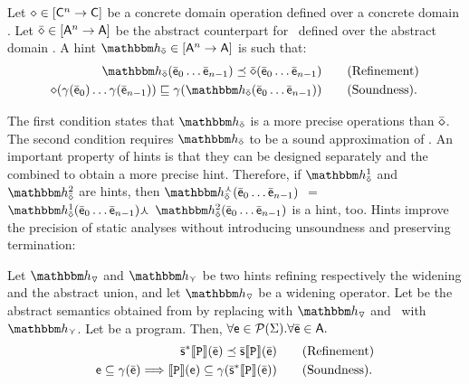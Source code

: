 \documentclass{llncs}
\begin{document}
\begin{definition}
\label{def:hints}
Let $\diamond \in [\mathsf{C}^n \rightarrow\mathsf{C}]$ be a concrete domain operation defined over a concrete domain .
Let $\bar{\mathsf{\mathsf{\diamond}}} \in [{\mathsf{A}}^n \rightarrow{\mathsf{A}}]$ be the abstract counterpart for \op\ defined over the abstract domain  .
A hint $\hint{\ael{\op}}\in \funzione{\adom{A}^n}{\adom{A}}$ is  such that:
\[
\begin{aligned}
\hint{\ael{\op}}(\ael{e}_0 \dots \ael{e}_{n-1}) \cless \ael{\op}(\ael{e}_0 \dots \ael{e}_{n-1}) & \qquad \text{\textrm{(Refinement)}}  \\
\op(\gamma( \ael{e}_0) \dots \gamma(\ael{e}_{n-1})) \less \gamma(\hint{\ael{\op}}(\ael{e}_0 \dots \ael{e}_{n-1})) & \qquad \text(\textrm{Soundness}).
\end{aligned}
\]
\end{definition}
The first condition states that $\hint{\ael{\op}}$ is a more precise operations than $\bar{\mathsf{\mathsf{\diamond}}}$.
The second condition requires $\hint{\ael{\op}}$ to be a sound approximation of \op.
An important property of hints is that they can be designed separately and the combined to obtain a more precise hint.
Therefore, if $\hint{\ael{\op}}^1$ and $\hint{\ael{\op}}^2$ are hints, then $\hint{\ael{\op}}^\cmeet(\ael{e}_0 \dots \ael{e}_{n-1})$ $=$ $\hint{\ael{\op}}^1(\ael{e}_0 \dots \ael{e}_{n-1}) \cmeet $ $\hint{\ael{\op}}^2(\ael{e}_0 \dots \ael{e}_{n-1})$ is a hint, too.
Hints improve the precision of static analyses without introducing unsoundness and preserving termination:

\begin{theorem}
Let $\hint{\widening}$ and $\hint{\cjoin}$ be two hints refining respectively the widening and the abstract union, and let $\hint{\widening}$ be a widening operator.
Let \asemRefined{\cdot} be the abstract semantics obtained from \asem{\cdot} by replacing \widening with $\hint{\widening}$ and \cjoin\ with $\hint{\cjoin}$.
Let  be a program.
Then, $\forall \mathsf{e}\in \mathcal{P}{(\Sigma)}. \forall \bar{\mathsf{\mathsf{e}}} \in \mathsf{A}.$ 
\[
\begin{aligned}
\mathbb{\bar{\mathsf{s}}^*}\llbracket \mathtt{P} \rrbracket(\bar{\mathsf{\mathsf{e}}}) \preceq \mathbb{\bar{\mathsf{s}}}\llbracket \mathtt{P} \rrbracket(\bar{\mathsf{\mathsf{e}}}) & \qquad \text{\textrm{(Refinement)}}  \\
\mathsf{e} \subseteq \gamma(\bar{\mathsf{\mathsf{e}}}) \Longrightarrow \llbracket \mathtt{P} \rrbracket(\mathsf{e}) \subseteq \gamma(\mathbb{\bar{\mathsf{s}}^*}\llbracket \mathtt{P} \rrbracket(\bar{\mathsf{\mathsf{e}}})) & \qquad \text{\textrm{(Soundness)}}.
\end{aligned}
\]
\end{theorem}
\end{document}
